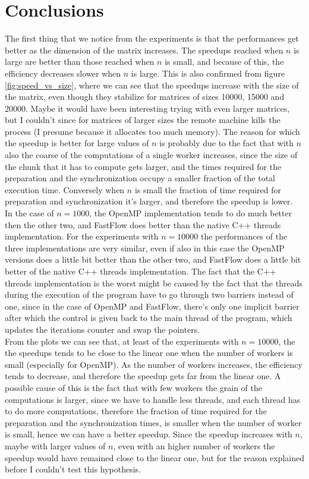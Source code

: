 \documentclass[12pt]{article}
\begin{document}
	\section{Conclusions}
	The first thing that we notice from the experiments is that the performances get better as the dimension of the matrix increases. The speedups reached when $n$ is large are better than those reached when $n$ is small, and because of this, the efficiency decreases slower when $n$ is large. This is also confirmed from figure \ref{fig:speed_vs_size}, where we can see that the speedups increase with the size of the matrix, even though they stabilize for matrices of sizes 10000, 15000 and 20000. Maybe it would have been interesting trying with even larger matrices, but I couldn't since for matrices of larger sizes the remote machine kills the process (I presume because it allocates too much memory). The reason for which the speedup is better for large values of $n$ is probably due to the fact that with $n$ also the coarse of the computations of a single worker increases, since the size of the chunk that it has to compute gets larger, and the times required for the preparation and the synchronization occupy a smaller fraction of the total execution time. Conversely when $n$ is small the fraction of time required for preparation and synchronization it's larger, and therefore the speedup is lower.\\
	In the case of $n = 1000$, the OpenMP implementation tends to do much better then the other two, and FastFlow does better than the native C++ threads implementation. For the experiments with $n = 10000$ the performances of the three implementations are very similar, even if also in this case the OpenMP versions does a little bit better than the other two, and FastFlow does a little bit better of the native C++ threads implementation. The fact that the C++ threads implementation is the worst might be caused by the fact that the threads during the execution of the program have to go through two barriers instead of one, since in the case of OpenMP and FastFlow, there's only one implicit barrier after which the control is given back to the main thread of the program, which updates the iterations counter and swap the pointers.\\
	From the plots we can see that, at least of the experiments with $n = 10000$, the the speedups tends to be close to the linear one when the number of workers is small (especially for OpenMP). As the number of workers increases, the efficiency tends to decrease, and therefore the speedup gets far from the linear one. A possible cause of this is the fact that with few workers the grain of the computations is larger, since we have to handle less threads, and each thread has to do more computations, therefore the fraction of time required for the preparation and the synchronization times, is smaller when the number of worker is small, hence we can have a better speedup. Since the speedup increases with $n$, maybe with larger values of $n$, even with an higher number of workers the speedup would have remained close to the linear one, but for the reason explained before I couldn't test this hypothesis.
	
\end{document}

